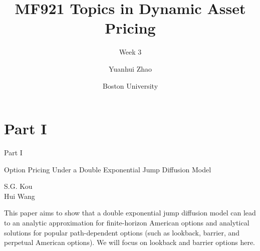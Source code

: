 \documentclass{beamer}
\title{MF921 Topics in Dynamic Asset Pricing}
\subtitle{Week 3}
\author{Yuanhui Zhao}
\date{Boston University}
\begin{document}
\frame{\titlepage}
\section{Part I}
\begin{frame}{Part I}
    \begin{center}
        Option Pricing Under a Double Exponential Jump Diffusion Model
    \end{center}
    \vspace{2em}
    \begin{center}
        S.G. Kou\\
        Hui Wang
    \end{center}
    \vspace{3em}
    \par This paper aims to show that a double exponential jump diffusion model can lead to an analytic approximation for finite-horizon
    American options and analytical solutions for popular path-dependent options (such as lookback, barrier, and perpetual American options). We will focus on lookback and barrier options here.
 \end{frame}
\end{document}
